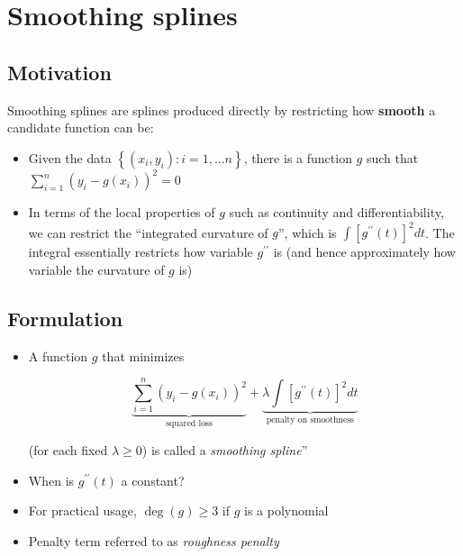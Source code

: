 \documentclass[]{article}
\begin{document}
\section{Smoothing splines}\label{smoothing-splines-2}

\subsection{Motivation}\label{motivation}

Smoothing splines are splines produced directly by restricting how
\textbf{smooth} a candidate function can be:

\begin{itemize}
\item
  Given the data
  \(\left\{ \left( x_{i},y_{i}\right) :i=1,...n\right\}\), there is a
  function \(g\) such that
  \(\sum_{i=1}^{n}\left( y_{i}-g\left( x_{i}\right) \right)^{2}=0\)
\item
  In terms of the local properties of \(g\) such as continuity and
  differentiability, we can restrict the \textquotedblleft integrated
  curvature of \(g\)\textquotedblright, which is
  \(\int\left[ g^{\prime\prime}\left( t\right) \right] ^{2}dt\). The
  integral essentially restricts how variable \(g^{\prime\prime}\) is
  (and hence approximately how variable the curvature of \(g\) is)
\end{itemize}

\subsection{Formulation}\label{formulation}

\begin{itemize}
\item
  A function \(g\) that minimizes

  \begin{equation}
  \underbrace{\sum_{i=1}^{n}\left(  y_{i}-g\left(  x_{i}\right)  \right)  ^{2}
  }_{\text{squared loss}}+\underbrace{\lambda\int\left[  g^{\prime\prime}\left(
  t\right)  \right]  ^{2}dt}_{\text{penalty on smoothness}} \label{eq76}%
  \end{equation}

  (for each fixed \(\lambda\geq0\)) is called a \emph{smoothing
  spline}\textquotedblright*
\item
  When is \(g^{\prime\prime}\left( t\right)\) a constant?
\item
  For practical usage, \(\deg\left( g\right) \ge 3\) if \(g\) is a
  polynomial
\item
  Penalty term referred to as \emph{roughness penalty}
\end{itemize}
\end{document}
